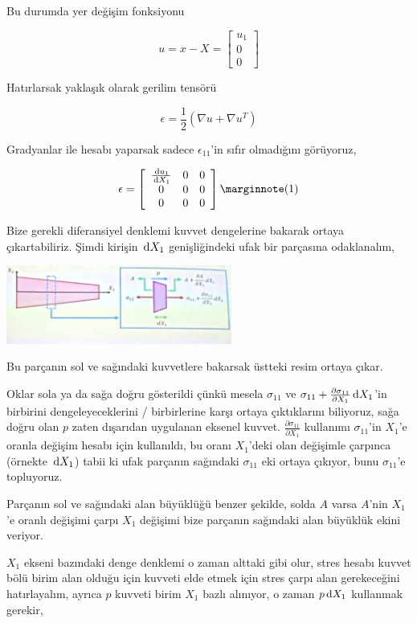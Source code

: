 \documentclass[12pt,fleqn]{article}\usepackage{../../common}
\begin{document}
Bu durumda yer değişim fonksiyonu

$$
u = x - X = \left[\begin{array}{c}
u_1 \\ 0 \\ 0
\end{array}\right]
$$

Hatırlarsak yaklaşık olarak gerilim tensörü

$$
\epsilon = \frac{1}{2} (\nabla u + \nabla u^T )
$$

Gradyanlar ile hesabı yaparsak sadece $\epsilon_{11}$'in sıfır olmadığını
görüyoruz,

$$
\epsilon = \left[\begin{array}{ccc}
\frac{\ud u_1}{\ud X_1} & 0 & 0 \\
0 & 0 & 0 \\
0 & 0 & 0 
\end{array}\right]
\mlabel{1}
$$

Bize gerekli diferansiyel denklemi kuvvet dengelerine bakarak ortaya
çıkartabiliriz. Şimdi kirişin $\,\mathrm{d} X_1$ genişliğindeki ufak bir parçasına
odaklanalım,

\includegraphics[width=20em]{phy_020_strs_04_07.jpg}

Bu parçanın sol ve sağındaki kuvvetlere bakarsak üstteki resim ortaya çıkar.

Oklar sola ya da sağa doğru gösterildi çünkü mesela $\sigma_{11}$ ve
$\sigma_{11} + \frac{\partial \sigma_{11}}{\partial X_1} \,\mathrm{d} X_1$'in
birbirini dengeleyeceklerini / birbirlerine karşı ortaya çıktıklarını
biliyoruz, sağa doğru olan $p$ zaten dışarıdan uygulanan eksenel kuvvet.
$\frac{\partial \sigma_{11}}{\partial X_1}$ kullanımı $\sigma_{11}$'in
$X_1$'e oranla değişim hesabı için kullanıldı, bu oranı $X_1$'deki
olan değişimle çarpınca (örnekte $\,\mathrm{d} X_1$) tabii ki ufak parçanın sağındaki
$\sigma_{11}$ eki ortaya çıkıyor, bunu $\sigma_{11}$'e topluyoruz.

Parçanın sol ve sağındaki alan büyüklüğü benzer şekilde, solda $A$ varsa
$A$'nin $X_1$'e oranlı değişimi çarpı $X_1$ değişimi bize parçanın sağındaki
alan büyüklük ekini veriyor. 

$X_1$ ekseni bazındaki denge denklemi o zaman alttaki gibi olur, stres hesabı
kuvvet bölü birim alan olduğu için kuvveti elde etmek için stres çarpı alan
gerekeceğini hatırlayalım, ayrıca $p$ kuvveti birim $X_1$ bazlı alınıyor,
o zaman $p \,\mathrm{d} X_1$ kullanmak gerekir,
\end{document}
